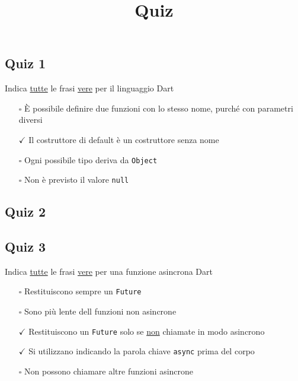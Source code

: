 \documentclass{article}
\title{Quiz}
\begin{document}
\subsection*{Quiz 1}
Indica \underline{tutte} le frasi \underline{vere} per il linguaggio Dart
\begin{itemize}
  \item[$\square$] È possibile definire due funzioni con lo stesso nome, purché con parametri diversi
  \item[$\checkmark$] Il costruttore di default è un costruttore senza nome
  \item[$\square$] Ogni possibile tipo deriva da \texttt{Object}
  \item[$\square$] Non è previsto il valore \texttt{null}
\end{itemize}
\subsection*{Quiz 2}

\begin{itemize}
\end{itemize}
\subsection*{Quiz 3}
Indica \underline{tutte} le frasi \underline{vere} per una funzione asincrona Dart
\begin{itemize}
  \item[$\square$] Restituiscono sempre un \texttt{Future}
  \item[$\square$] Sono più lente dell funzioni non asincrone
  \item[$\checkmark$] Restituiscono un \texttt{Future} solo se \underline{non} chiamate in modo asincrono
  \item[$\checkmark$] Si utilizzano indicando la parola chiave \texttt{async} prima del corpo
  \item[$\square$] Non possono chiamare altre funzioni asincrone
\end{itemize}
\end{document}
